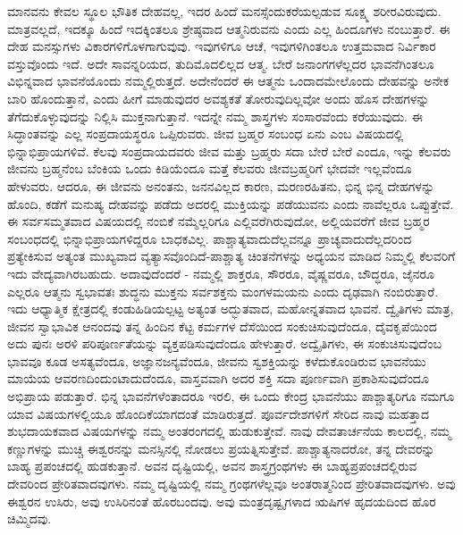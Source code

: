 ಮಾನವನು ಕೇವಲ ಸ್ಥೂಲ ಭೌತಿಕ ದೇಹವಲ್ಲ, ಇದರ ಹಿಂದೆ ಮನಸ್ಸೆಂದು\break ಕರೆಯಲ್ಪಡುವ ಸೂಕ್ಷ್ಮ ಶರೀರವಿರುವುದು. ಮಾತ್ರವಲ್ಲದೆ, ಇದಕ್ಕೂ ಹಿಂದೆ ಇದಕ್ಕಿಂತಲೂ ಶ್ರೇಷ್ಠವಾದ ಆತ್ಮನಿರುವನು ಎಂದು ಎಲ್ಲ ಹಿಂದೂಗಳು ನಂಬುತ್ತಾರೆ. ಈ ದೇಹ ಮನಸ್ಸುಗಳು ವಿಕಾರಗಳಿಗೊಳಗಾಗುವುವು. ಇವುಗಳಿಗೂ ಆಚೆ, ಇವುಗಳಿಗಿಂತಲೂ ಉತ್ತಮವಾದ ನಿರ್ವಿಕಾರ ವಸ್ತುವೊಂದು ಇದೆ. ಅದೇ ಸಾವನ್ನರಿಯದ, ತುದಿಮೊದಲಿಲ್ಲದ ಆತ್ಮ. ಬೇರೆ ಜನಾಂಗಗಳೆಲ್ಲದರ ಭಾವನೆಗಿಂತಲೂ ವಿಭಿನ್ನವಾದ ಭಾವನೆಯೊಂದು ನಮ್ಮಲ್ಲಿರುತ್ತದೆ. ಅದೇನೆಂದರೆ ಈ ಆತ್ಮನು ಒಂದಾದಮೇಲೊಂದು ದೇಹವನ್ನು ಅನೇಕ ಬಾರಿ ಹೊಂದುತ್ತಾನೆ, ಎಂದು ಹೀಗೆ ಮಾಡುವುದರ ಅವಶ್ಯಕತೆ ತೋರುವುದಿಲ್ಲವೋ ಅಂದು ಹೊಸ ದೇಹಗಳನ್ನು ತೆಗೆದುಕೊಳ್ಳುವುದನ್ನು ನಿಲ್ಲಿಸಿ ಮುಕ್ತನಾಗುತ್ತಾನೆ. ಇದನ್ನೇ ನಮ್ಮ ಶಾಸ್ತ್ರಗಳು ಸಂಸಾರವೆಂದು ಕರೆಯುವುದು. ಈ ಸಿದ್ಧಾಂತವನ್ನು ಎಲ್ಲ ಸಂಪ್ರದಾಯಸ್ಥರೂ ಒಪ್ಪಿರುವರು. ಜೀವ ಬ್ರಹ್ಮರ ಸಂಬಂಧ ಏನು ಎಂಬ ವಿಷಯದಲ್ಲಿ ಭಿನ್ನಾಭಿಪ್ರಾಯಗಳಿವೆ. ಕೆಲವು ಸಂಪ್ರದಾಯದವರು ಜೀವ ಮತ್ತು ಬ್ರಹ್ಮರು ಸದಾ ಬೇರೆ ಬೇರೆ ಎಂದೂ, ಇನ್ನು ಕೆಲವರು ಜೀವನು ಬ್ರಹ್ಮನೆಂಬ ಬೆಂಕಿಯ ಒಂದು ಕಿಡಿಯೆಂದೂ ಮತ್ತೆ ಕೆಲವರು ಜೀವಬ್ರಹ್ಮರಿಗೆ ಭೇದವೇ ಇಲ್ಲವೆಂದೂ ಹೇಳುವರು. ಆದರೂ, ಈ ಜೀವನು ಅನಂತನು, ಜನನವಿಲ್ಲದ ಕಾರಣ, ಮರಣರಹಿತನು, ಭಿನ್ನ ಭಿನ್ನ ದೇಹಗಳನ್ನು ಹೊಂದಿ, ಕಡೆಗೆ ಮನುಷ್ಯ ದೇಹವನ್ನು ಪಡೆದು ಅದರಲ್ಲಿ ಮುಕ್ತಿಯನ್ನು ಪಡೆಯುವನು ಎಂದು ನಾವೆಲ್ಲರೂ ಒಪ್ಪುತ್ತೇವೆ. ಈ ಸರ್ವಸಮ್ಮತವಾದ ವಿಷಯದಲ್ಲಿ ನಂಬಿಕೆ ನಮ್ಮೆಲ್ಲರಿಗೂ ಎಲ್ಲಿವರೆಗಿರುವುದೋ, ಅಲ್ಲಿಯವರೆಗೆ ಜೀವ ಬ್ರಹ್ಮರ ಸಂಬಂಧದಲ್ಲಿ ಭಿನ್ನಾಭಿಪ್ರಾಯಗಳಿದ್ದರೂ ಬಾಧಕವಿಲ್ಲ. ಪಾಶ್ಚಾತ್ಯವಾದುದೆಲ್ಲವನ್ನೂ ಪ್ರಾಚ್ಯವಾದುದೆಲ್ಲದರಿಂದ ಪ್ರತ್ಯೇಕಿಸುವ ಅತ್ಯಂತ ಮುಖ್ಯವಾದ ವ್ಯತ್ಯಾಸವೊಂದಿದೆ-ಪಾಶ್ಚಾತ್ಯ ಚಿಂತನೆಗಳನ್ನು ಅಧ್ಯಯನ ಮಾಡಿದ ನಿಮ್ಮಲ್ಲಿ ಕೆಲವರಿಗೆ ಇದು ವೇದ್ಯವಾಗಿರಬಹುದು. ಅದಾವುದೆಂದರೆ - ನಮ್ಮಲ್ಲಿ ಶಾಕ್ತರೂ, ಸೌರರೂ, ವೈಷ್ಣವರೂ, ಬೌದ್ಧರೂ, ಜೈನರೂ ಎಲ್ಲರೂ ಆತ್ಮನು ಸ್ವಭಾವತಃ ಶುದ್ಧನು ಮುಕ್ತನು ಸರ್ವಶಕ್ತನು ಮಂಗಳಮಯನು ಎಂದು ದೃಢವಾಗಿ ನಂಬಿರುತ್ತಾರೆ. ಇದು ಆಧ್ಯಾತ್ಮಿಕ ಕ್ಷೇತ್ರದಲ್ಲಿ ಕಂಡುಹಿಡಿಯಲ್ಪಟ್ಟ ಅತ್ಯಂತ ಅದ್ಭುತವಾದ, ಮಹೋನ್ನತವಾದ ಭಾವನೆ. ದ್ವೈತಿಗಳು ಮಾತ್ರ, ಜೀವನ ಸ್ವಾಭಾವಿಕ ಆನಂದವು ತನ್ನ ಹಿಂದಿನ ಕೆಟ್ಟ ಕರ್ಮಗಳ ದೆಸೆಯಿಂದ ಸಂಕುಚಿಸುವುದೆಂದೂ, ದೈವಕೃಪೆಯಿಂದ ಅದು ಪುನಃ ಅರಳಿ ಪರಿಪೂರ್ಣತೆಯನ್ನು ವ್ಯಕ್ತಪಡಿಸುವುದೆಂದೂ ಹೇಳುತ್ತಾರೆ. ಅದ್ವೈತಿಗಳು, ಈ ಸಂಕುಚಿಸುವುದೆಂಬ ಭಾವವೂ ಕೂಡ ಅಸತ್ಯವೆಂದೂ, ಅಜ್ಞಾನಜನ್ಯವೆಂದೂ, ಜೀವನು ಸ್ವಶಕ್ತಿಯನ್ನು ಕಳೆದುಕೊಂಡಿರುವ ಭಾವನೆಯು ಮಾಯೆಯ ಆವರಣದಿಂದುಂಟಾದುದೆಂದೂ, ವಾಸ್ತವವಾಗಿ ಅದರ ಶಕ್ತಿ ಸದಾ ಪೂರ್ಣವಾಗಿ ಪ್ರಕಾಶಿಸುವುದೆಂದೂ ಅಭಿಪ್ರಾಯ ಪಡುತ್ತಾರೆ. ಭಿನ್ನ ಭಾವನೆಗಳೆಂತಾದರೂ ಇರಲಿ, ಈ ಒಂದು ಕೇಂದ್ರ ಭಾವನೆಯು ಪಾಶ್ಚಾತ್ಯರಿಗೂ ನಮಗೂ ಯಾವ ವಿಷಯಗಳಲ್ಲಿಯೂ ಹೊಂದಿಕೆಯಾಗದಂತೆ ಮಾಡಿರುತ್ತದೆ. ಪೂರ್ವದೇಶಗಳಿಗೆ ಸೇರಿದ ನಾವು ಮಹತ್ತಾದ ಶುಭದಾಯಕವಾದ ವಿಷಯಗಳನ್ನು ನಮ್ಮ ಅಂತರಂಗದಲ್ಲಿ ಹುಡುಕುತ್ತೇವೆ. ನಾವು ದೇವತಾರ್ಚನೆಯ ಕಾಲದಲ್ಲಿ, ನಮ್ಮ ಕಣ್ಣುಗಳನ್ನು ಮುಚ್ಚಿ ಈಶ್ವರನನ್ನು ಮನಸ್ಸಿನಲ್ಲಿ ನೋಡಲು ಪ್ರಯತ್ನಿಸುತ್ತೇವೆ. ಪಾಶ್ಚಾತ್ಯನಾದರೋ, ತನ್ನ ದೇವರನ್ನು ಬಾಹ್ಯ ಪ್ರಪಂಚದಲ್ಲಿ ಹುಡಕುತ್ತಾನೆ. ಅವನ ದೃಷ್ಟಿಯಲ್ಲಿ, ಅವನ ಶಾಸ್ತ್ರಗ್ರಂಥಗಳು ಈ ಬಾಹ್ಯಪ್ರಪಂಚದಲ್ಲಿರುವ ದೇವರಿಂದ ಪ್ರೇರಿತವಾದವುಗಳು. ನಮ್ಮ ದೃಷ್ಟಿಯಲ್ಲಿ ನಮ್ಮ ಗ್ರಂಥಗಳೆಲ್ಲವೂ ಅಂತರಾತ್ಮನಿಂದ ಪ್ರೇರಿತವಾದವುಗಳು. ಅವು ಈಶ್ವರನ ಉಸಿರು, ಅವು ಉಸಿರಿನಂತೆ ಹೊರಬಂದವು. ಅವು ಮಂತ್ರದೃಷ್ಟೃಗಳಾದ ಋಷಿಗಳ ಹೃದಯದಿಂದ ಹೊರ ಚಿಮ್ಮಿದವು.

